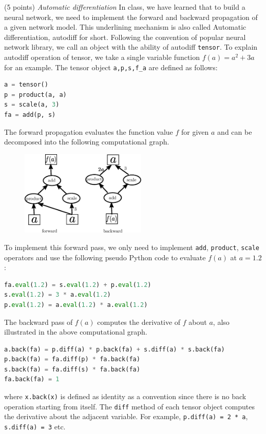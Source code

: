\documentclass[a4paper, 12pt]{exam}
\begin{document}
	\begin{questions}
		\question (5 points) \emph{Automatic differentiation} In class, we have learned that to build a neural network, we need to implement the forward
		and backward propagation of a given network model. This underlining mechanism is also called Automatic differentiation, autodiff for short.
		Following the convention of popular neural network library, we call an object with the ability of autodiff \texttt{tensor}.
		To explain autodiff operation of tensor, we take a single variable function $f(a) = a^2 + 3a$ for an example. The tensor object
		\texttt{a,p,s,f\_a} are defined as follows:
		\begin{lstlisting}[language=Python]
a = tensor()
p = product(a, a)
s = scale(a, 3)
fa = add(p, s)
		\end{lstlisting}
		The forward propagation evaluates the function value $f$ for given $a$ and can be decomposed into the following computational graph.
		\begin{figure}[!ht]
			\centering
			\includegraphics[width=6cm]{auto.eps}
		\end{figure}
		To implement this forward pass, we only need to implement \texttt{add}, \texttt{product}, \texttt{scale} operators and use the following pseudo Python code
		to evaluate $f(a)$ at $a=1.2$:
		\begin{lstlisting}[language=Python]
fa.eval(1.2) = s.eval(1.2) + p.eval(1.2)
s.eval(1.2) = 3 * a.eval(1.2)
p.eval(1.2) = a.eval(1.2) * a.eval(1.2)
		\end{lstlisting}
		The backward pass of $f(a)$ computes the derivative of $f$ about $a$, also illustrated in the above computational graph.
		\begin{lstlisting}[language=Python]
a.back(fa) = p.diff(a) * p.back(fa) + s.diff(a) * s.back(fa)
p.back(fa) = fa.diff(p) * fa.back(fa)
s.back(fa) = fa.diff(s) * fa.back(fa)
fa.back(fa) = 1
		\end{lstlisting}
		where \texttt{x.back(x)} is defined as identity as a convention since there is no back operation starting from itself.
		The \texttt{diff} method of each tensor object computes the derivative about the adjacent variable.
		For example, \texttt{p.diff(a) = 2 * a}, \texttt{s.diff(a) = 3} etc.
		

\end{questions}
\end{document}
